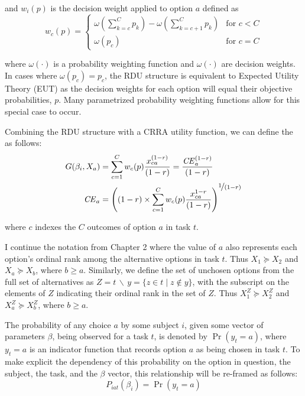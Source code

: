 \documentclass[../main.tex]{subfiles}
\begin{document}
\noindent and $w_i(p)$ is the decision weight applied to option $a$ defined as
\begin{equation}
	\label{eq3:dweight}
	w_c(p) =
	\begin{cases}
		\omega\left(\displaystyle\sum_{k=c}^C p_k\right) - \omega\left(\displaystyle\sum_{k=c+1}^C p_k\right) & \text{for } c<C \\
		\omega(p_c) & \text{for } c = C
	\end{cases}
\end{equation}

\noindent where $\omega(\cdot)$ is a probability weighting function and $\omega(\cdot)$ are decision weights.
In cases where $\omega(p_c) = p_c$, the RDU structure is equivalent to Expected Utility Theory (EUT) as the decision weights for each option will equal their objective probabilities, $p$.
Many parametrized probability weighting functions allow for this special case to occur.

Combining the RDU structure with a CRRA utility function, we can define the {\CE} as follows:
\begin{align}
	\label{eq3:CEcalc}
	\begin{split}
		G(\beta_i,X_a) &= \sum_{c=1}^{C} w_c(p) \frac{x_{ca}^{(1-r)}}{(1-r)} = \frac{ {\mathit{CE}}_a^{(1-r)}}{(1-r)}\\
		{\mathit{CE}}_a &=  \left( (1-r) \times \sum_{c=1}^{C} w_c(p) \frac{x_{ca}^{1-r}}{(1-r)} \right)^{ \displaystyle\nicefrac{1}{(1-r)} }
	\end{split}
\end{align}

\noindent where $c$ indexes the $C$ outcomes of option $a$ in task $t$.

I continue the notation from Chapter 2 where the value of $a$ also represents each option's ordinal rank among the alternative options in task $t$.
Thus $X_1 \succcurlyeq X_2$ and $X_a \succcurlyeq X_b$, where $b \geq a$.
Similarly, we define the set of unchosen options from the full set of alternatives as $Z = t \,\backslash\, y = \{z \in t \;|\; z \notin y \}$, with the subscript on the elements of $Z$ indicating their ordinal rank in the set of $Z$.
Thus $X_1^Z \succcurlyeq X_2^Z$ and $X_a^Z \succcurlyeq X_b^Z$, where $b \geq a$.

The probability of any choice $a$ by some subject $i$, given some vector of parameters $\beta$, being observed for a task $t$, is denoted by $\Pr( y_t = a)$, where $y_t = a$ is an indicator function that records option $a$ as being chosen in task $t$.
To make explicit the dependency of this probability on the option in question, the subject, the task, and the $\beta$ vector, this relationship will be re-framed as follows:
\begin{equation}
	\label{eq3:Piat}
	P_{iat}(\beta_i) = \Pr(y_t = a)
\end{equation}
\end{document}
